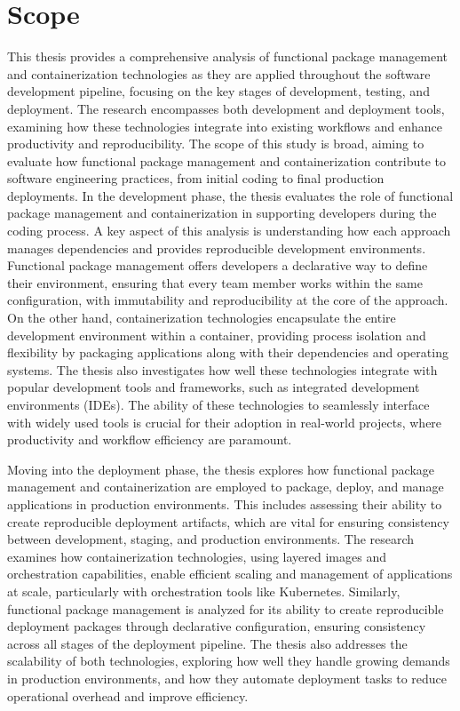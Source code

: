 \section{Scope}

This thesis provides a comprehensive analysis of functional package management and
containerization technologies as they are applied throughout the software development
pipeline, focusing on the key stages of development, testing, and deployment. The
research encompasses both development and deployment tools, examining how these
technologies integrate into existing workflows and enhance productivity and reproducibility.
The scope of this study is broad, aiming to evaluate how functional package management
and containerization contribute to software engineering practices, from initial coding
to final production deployments.
In the development phase, the thesis evaluates the role of functional package management
and containerization in supporting developers during the coding process. A key aspect
of this analysis is understanding how each approach manages dependencies and provides
reproducible development environments. Functional package management offers developers
a declarative way to define their environment, ensuring that every team member works
within the same configuration, with immutability and reproducibility at the core of the
approach. On the other hand, containerization technologies encapsulate the entire
development environment within a container, providing process isolation and flexibility
by packaging applications along with their dependencies and operating systems. The thesis
also investigates how well these technologies integrate with popular development tools
and frameworks, such as integrated development environments (IDEs). The ability of these
technologies to seamlessly interface with widely used tools is crucial for their adoption
in real-world projects, where productivity and workflow efficiency are paramount.

Moving into the deployment phase, the thesis explores how functional package management
and containerization are employed to package, deploy, and manage applications in production
environments. This includes assessing their ability to create reproducible deployment
artifacts, which are vital for ensuring consistency between development, staging, and
production environments. The research examines how containerization technologies, using
layered images and orchestration capabilities, enable efficient scaling and management
of applications at scale, particularly with orchestration tools like Kubernetes. Similarly,
functional package management is analyzed for its ability to create reproducible deployment
packages through declarative configuration, ensuring consistency across all stages of the
deployment pipeline. The thesis also addresses the scalability of both technologies,
exploring how well they handle growing demands in production environments, and how they
automate deployment tasks to reduce operational overhead and improve efficiency.

